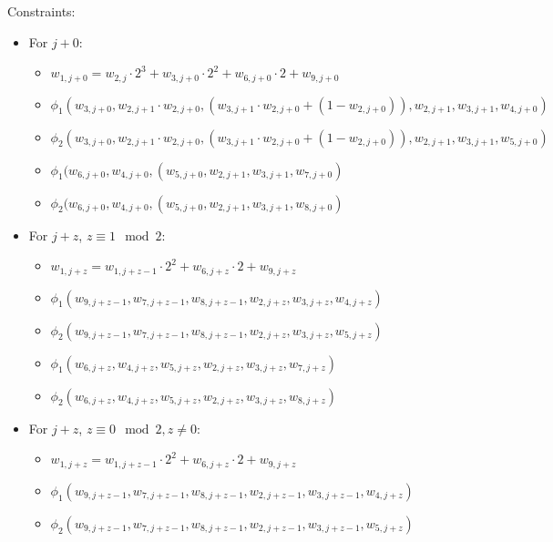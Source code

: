 Constraints:
\begin{itemize}
    \item For $j + 0$:
        \begin{itemize}
            \item $w_{1, j + 0} = w_{2, j} \cdot 2^3 + w_{3, j + 0} \cdot 2^2 + w_{6, j + 0} \cdot 2 + w_{9, j + 0}$
            \item $\phi_1(w_{3, j + 0}, w_{2, j + 1} \cdot w_{2, j + 0}, (w_{3, j + 1} \cdot w_{2, j + 0} + (1 - w_{2, j + 0})), w_{2, j + 1}, w_{3, j + 1}, w_{4, j + 0})$
            \item $\phi_2(w_{3, j + 0}, w_{2, j + 1} \cdot w_{2, j + 0}, (w_{3, j + 1} \cdot w_{2, j + 0} + (1 - w_{2, j + 0})), w_{2, j + 1}, w_{3, j + 1}, w_{5, j + 0})$
            \item $\phi_1(w_{6, j + 0}, w_{4, j + 0}, (w_{5, j + 0}, w_{2, j + 1}, w_{3, j + 1}, w_{7, j + 0})$
            \item $\phi_2(w_{6, j + 0}, w_{4, j + 0}, (w_{5, j + 0}, w_{2, j + 1}, w_{3, j + 1}, w_{8, j + 0})$
        \end{itemize}
    \item For $j + z$, $z \equiv 1 \mod 2$:
        \begin{itemize}
            \item $w_{1, j + z} = w_{1, j + z - 1} \cdot 2^2 + w_{6, j + z} \cdot 2 + w_{9, j + z}$
            \item $\phi_1(w_{9, j + z - 1}, w_{7, j + z - 1}, w_{8, j + z - 1}, w_{2, j + z}, w_{3, j + z}, w_{4, j + z})$
            \item $\phi_2(w_{9, j + z - 1}, w_{7, j + z - 1}, w_{8, j + z - 1}, w_{2, j + z}, w_{3, j + z}, w_{5, j + z})$
            \item $\phi_1(w_{6, j + z}, w_{4, j + z}, w_{5, j + z}, w_{2, j + z}, w_{3, j + z}, w_{7, j + z})$
            \item $\phi_2(w_{6, j + z}, w_{4, j + z}, w_{5, j + z}, w_{2, j + z}, w_{3, j + z}, w_{8, j + z})$         
        \end{itemize}
    \item For $j + z$, $z \equiv 0 \mod 2, z \neq 0$:
        \begin{itemize}
            \item $w_{1, j + z} = w_{1, j + z - 1} \cdot 2^2 + w_{6, j + z} \cdot 2 + w_{9, j + z}$
            \item $\phi_1(w_{9, j + z - 1}, w_{7, j + z - 1}, w_{8, j + z - 1}, w_{2, j + z - 1}, w_{3, j + z - 1}, w_{4, j + z})$
            \item $\phi_2(w_{9, j + z - 1}, w_{7, j + z - 1}, w_{8, j + z - 1}, w_{2, j + z - 1}, w_{3, j + z - 1}, w_{5, j + z})$

\end{itemize}
\end{itemize}
